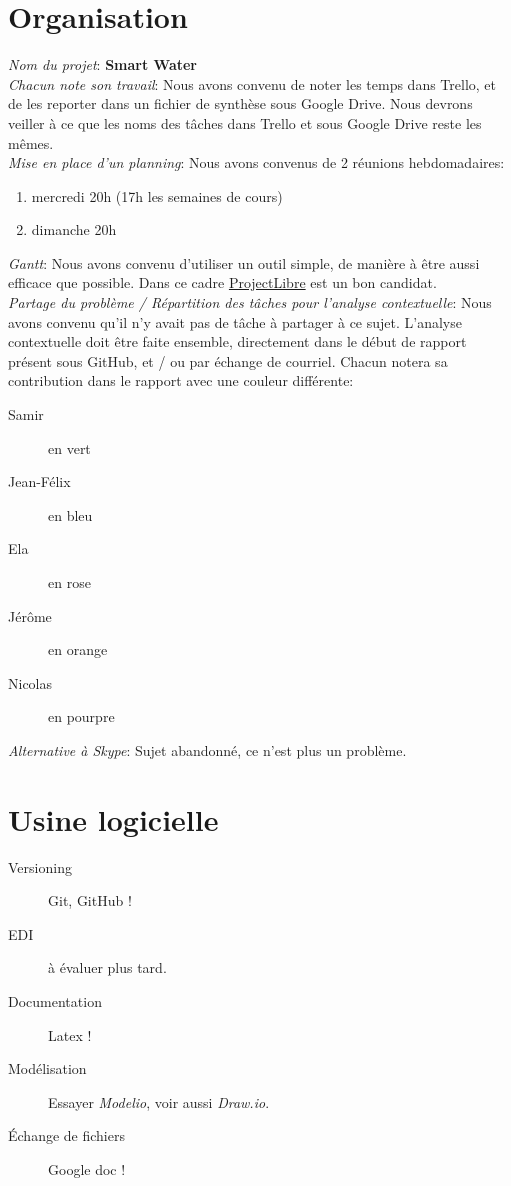 \documentclass[11pt,a4paper,french,twoside,openright]{article}
\begin{document}
\section{Organisation}
\noindent
\emph{Nom du projet}: \textbf{Smart Water}\\
\emph{Chacun note son travail}: Nous avons convenu de noter les temps dans Trello, et de les reporter dans un fichier de synthèse sous Google Drive.
Nous devrons veiller à ce que les noms des tâches dans Trello et sous Google Drive reste les mêmes.\\
\emph{Mise en place d'un planning}: Nous avons convenus de 2 réunions hebdomadaires:
\begin{enumerate}
\item mercredi 20h (17h les semaines de cours)
\item dimanche 20h
\end{enumerate}
\emph{Gantt}: Nous avons convenu d'utiliser un outil simple, de manière à être aussi efficace que possible.
Dans ce cadre \href{http://www.projectlibre.com}{ProjectLibre} est un bon candidat.\\
\emph{Partage du problème / Répartition des tâches pour l'analyse contextuelle}: Nous avons convenu qu'il n'y avait pas de tâche à partager à ce sujet. L'analyse contextuelle doit être faite ensemble, directement dans le début de rapport présent sous GitHub, et / ou par échange de courriel. Chacun notera sa contribution dans le rapport avec une couleur différente:
  \begin{description}
  \item[Samir] en vert
  \item[Jean-Félix] en bleu
  \item[Ela] en rose
  \item[Jérôme] en orange
  \item[Nicolas] en pourpre
  \end{description}
\emph{Alternative à Skype}: Sujet abandonné, ce n'est plus un problème.

\section{Usine logicielle}
  \begin{description}
  \item[Versioning] Git, GitHub !
  \item[EDI] à évaluer plus tard.
  \item[Documentation] Latex !
  \item[Modélisation] Essayer \emph{Modelio}, voir aussi \emph{Draw.io}.
  \item[Échange de fichiers] Google doc !
  \end{description}
\end{document}
